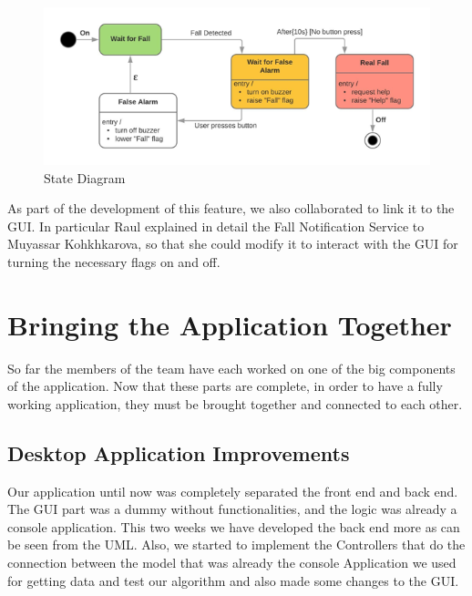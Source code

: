 \documentclass[12pt]{article}
\begin{document}
\FloatBarrier
\begin{figure}[h]
	\centering
	\includegraphics[scale=0.80]{images/State_Diag.png}
	\caption{State Diagram}
	\label{img:State_Diag}
\end{figure}
\FloatBarrier

As part of the development of this feature, we also collaborated to link it to the GUI. In particular Raul explained in detail the Fall Notification Service to Muyassar Kohkhkarova, so that she could modify it to interact with the GUI for turning the necessary flags on and off.\\

\section{Bringing the Application Together}
So far the members of the team have each worked on one of the big components of the application. Now that these parts are complete, in order to have a fully working application, they must be brought together and connected to each other.

\subsection{Desktop Application Improvements}
Our application until now was completely separated the front end and back end.\\
The GUI part was a dummy without functionalities, and the logic was already a console application.
This two weeks we have developed the back end more as can be seen from the UML. Also, we started to implement the Controllers that do the connection between the model that was already the console Application we used for getting data and test our algorithm and also made some changes to the GUI.
\end{document}
